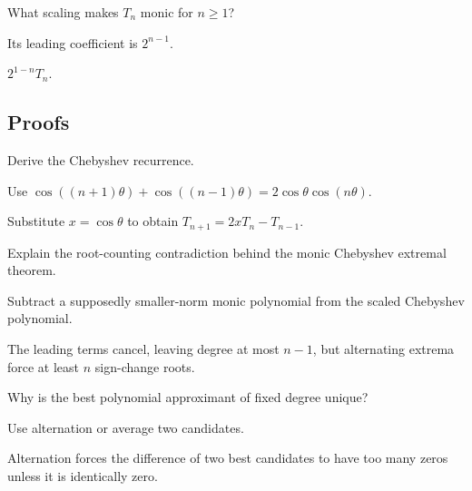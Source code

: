\begin{exercise}\label{exr:ii22-expand-05}
What scaling makes \(T_n\) monic for \(n\ge1\)?
\end{exercise}
\begin{hint}
Its leading coefficient is \(2^{n-1}\).
\end{hint}
\begin{solution}
\(2^{1-n}T_n\).
\end{solution}

\subsection*{Proofs}

\begin{exercise}\label{exr:ii22-expand-06}
Derive the Chebyshev recurrence.
\end{exercise}
\begin{hint}
Use \(\cos((n+1)\theta)+\cos((n-1)\theta)=2\cos\theta\cos(n\theta)\).
\end{hint}
\begin{solution}
Substitute \(x=\cos\theta\) to obtain \(T_{n+1}=2xT_n-T_{n-1}\).
\end{solution}

\begin{exercise}\label{exr:ii22-expand-07}
Explain the root-counting contradiction behind the monic Chebyshev extremal theorem.
\end{exercise}
\begin{hint}
Subtract a supposedly smaller-norm monic polynomial from the scaled Chebyshev polynomial.
\end{hint}
\begin{solution}
The leading terms cancel, leaving degree at most \(n-1\), but alternating extrema force at least \(n\) sign-change roots.
\end{solution}

\begin{exercise}\label{exr:ii22-expand-08}
Why is the best polynomial approximant of fixed degree unique?
\end{exercise}
\begin{hint}
Use alternation or average two candidates.
\end{hint}
\begin{solution}
Alternation forces the difference of two best candidates to have too many zeros unless it is identically zero.
\end{solution}

